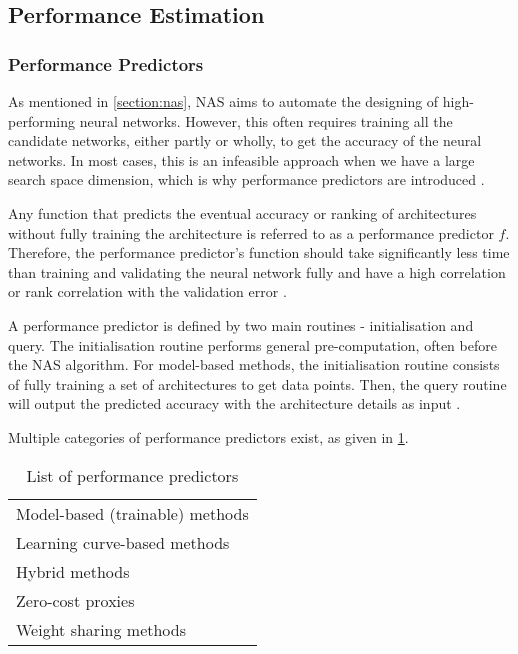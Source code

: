 \subsection{Performance Estimation}
\subsubsection{Performance Predictors}\label{sec:performancepredictors}
As mentioned in \cref{section:nas}, \gls{NAS} aims to automate the designing of high-performing neural networks. However, this often requires training all the candidate networks, either partly or wholly, to get the accuracy of the neural networks. In most cases, this is an infeasible approach when we have a large search space dimension, which is why performance predictors are introduced \autocite{akhauri2022evolving}. 

\begin{comment}
    
In most cases, this is an infeasible approach when the search space is big, which is why performance predictors are introduced \autocite{akhauri2022evolving}. 
\end{comment}

Any function that predicts the eventual accuracy or ranking of architectures without fully training the architecture is referred to as a performance predictor $f$. Therefore, the performance predictor's function should take significantly less time than training and validating the neural network fully and have a high correlation or rank correlation with the validation error \autocite{white2021powerful}. 

A performance predictor is defined by two main routines - initialisation and query. The initialisation routine performs general pre-computation, often before the \gls{NAS} algorithm. For model-based methods, the initialisation routine consists of fully training a set of architectures to get data points. Then, the query routine will output the predicted accuracy with the architecture details as input \autocite{white2021powerful}. 

Multiple categories of performance predictors exist, as given in \cref{tab:zero-cost}. 

\begin{table}[ht]
\caption{List of performance predictors}
\centering
\begin{tabular}{|l}
Model-based (trainable) methods \\
\cellcolor{verylightgray}Learning curve-based methods    \\
Hybrid methods                  \\
\cellcolor{verylightgray}Zero-cost proxies               \\
Weight sharing methods         
\end{tabular}
\label{tab:zero-cost}
\end{table}

